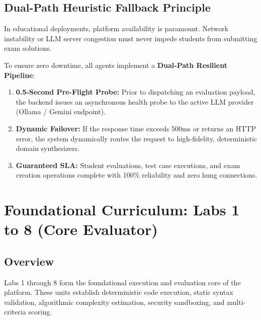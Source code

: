 \documentclass[12pt, a4paper]{report}
\begin{document}
\section{Dual-Path Heuristic Fallback Principle}
In educational deployments, platform availability is paramount. Network instability or LLM server congestion must never impede students from submitting exam solutions. 

To ensure zero downtime, all agents implement a \textbf{Dual-Path Resilient Pipeline}:
\begin{enumerate}[itemsep=2pt,leftmargin=1.5em]
    \item \textbf{0.5-Second Pre-Flight Probe:} Prior to dispatching an evaluation payload, the backend issues an asynchronous health probe to the active LLM provider (Ollama / Gemini endpoint).
    \item \textbf{Dynamic Failover:} If the response time exceeds 500ms or returns an HTTP error, the system dynamically routes the request to high-fidelity, deterministic domain synthesizers.
    \item \textbf{Guaranteed SLA:} Student evaluations, test case executions, and exam creation operations complete with 100\% reliability and zero hung connections.
\end{enumerate}

\chapter{Foundational Curriculum: Labs 1 to 8 (Core Evaluator)}

\section{Overview}
Labs 1 through 8 form the foundational execution and evaluation core of the platform. These units establish deterministic code execution, static syntax validation, algorithmic complexity estimation, security sandboxing, and multi-criteria scoring.
\end{document}
